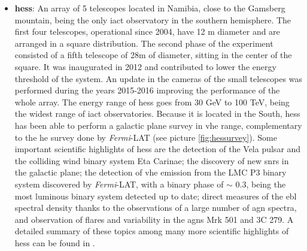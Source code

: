 \documentclass[main.tex]{subfiles}
\begin{document}
\begin{itemize}
\item \textbf{\gls{hess}}: An array of 5 telescopes located in Namibia, close to the Gamsberg mountain, being the only \gls{iact} observatory in the southern hemisphere. The first four telescopes, operational since 2004, have 12 m diameter and are arranged in a square distribution. The second phase of the experiment consisted of a fifth telescope of 28m of diameter, sitting in the center of the square. It was inaugurated in 2012 and contributed to lower the energy threshold of the system. An update in the cameras of the small telescopes was performed during the years 2015-2016 improving the performance of the whole array. The energy range of \gls{hess} goes from 30 GeV to 100 TeV, being the widest range of \gls{iact} observatories.
  Because it is located in the South, \gls{hess} has been able to perform a galactic plane survey in \gls{vhe} range, complementary to the \gls{he} survey done  by \textit{Fermi}-LAT (see picture \ref{fig:hessurvey}). Some important scientific highlights of \gls{hess} are the detection of the Vela pulsar and the colliding wind binary system Eta Carinae; the discovery of new \glspl{snr} in the galactic plane; the detection of \gls{vhe} emission from the LMC P3 binary system discovered by \textit{Fermi}-LAT, with a binary phase of $\sim$ 0.3, being the most luminous binary system detected up to date;  direct measures of the \gls{ebl} spectral density thanks to the observations of a large number of \gls{agn} spectra, and observation of flares and variability in the \glspl{agn} Mrk 501 and 3C 279. A detailed summary of these topics among many more scientific highlights of \gls{hess} can be found in \cite{2018HESS}.\\


\end{itemize}
\end{document}
